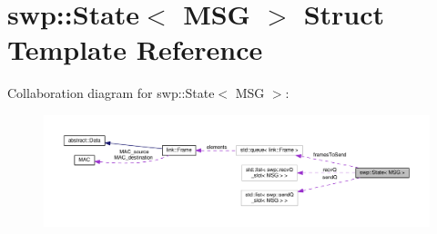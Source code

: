 \hypertarget{structswp_1_1State}{}\section{swp\+:\+:State$<$ M\+SG $>$ Struct Template Reference}
\label{structswp_1_1State}


Collaboration diagram for swp\+:\+:State$<$ M\+SG $>$\+:\nopagebreak
\begin{figure}[H]
\begin{center}
\leavevmode
\includegraphics[width=350pt]{structswp_1_1State__coll__graph}
\end{center}
\end{figure}
